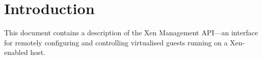 \documentclass{report}
\begin{document}



\chapter{Introduction}

This document contains a description of the Xen Management API---an interface for
remotely configuring and controlling virtualised guests running on a
Xen-enabled host. 







\end{document}
